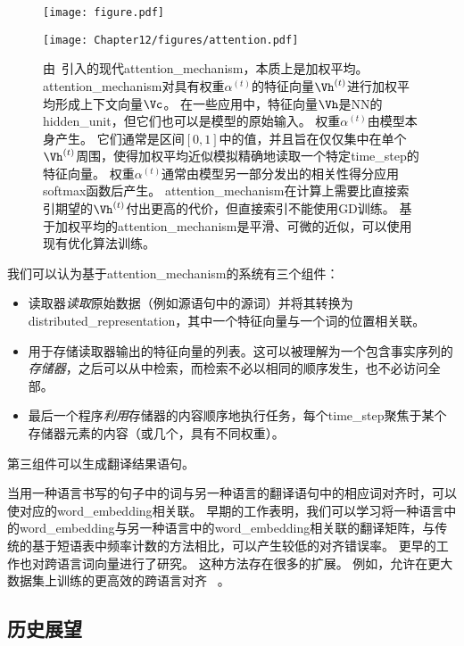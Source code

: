  \begin{figure}[htp]
\ifOpenSource
\centerline{\texttt{[image: figure.pdf]}}
\else
\centerline{\texttt{[image: Chapter12/figures/attention.pdf]}}
\fi
\caption{由~\citet{Bahdanau-et-al-ICLR2015-small}引入的现代\gls{attention_mechanism}，本质上是加权平均。
\gls{attention_mechanism}对具有权重$\alpha^{(t)}$的特征向量$\Vh^{(t)}$进行加权平均形成上下文向量$\Vc$。
在一些应用中，特征向量$\Vh$是\gls{NN}的\gls{hidden_unit}，但它们也可以是模型的原始输入。
权重$\alpha^{(t)}$由模型本身产生。
它们通常是区间$[0,1]$中的值，并且旨在仅仅集中在单个$\Vh^{(t)}$周围，使得加权平均近似模拟精确地读取一个特定\gls{time_step}的特征向量。
权重$\alpha^{(t)}$通常由模型另一部分发出的相关性得分应用softmax函数后产生。
\gls{attention_mechanism}在计算上需要比直接索引期望的$\Vh^{(t)}$付出更高的代价，但直接索引不能使用\gls{GD}训练。
基于加权平均的\gls{attention_mechanism}是平滑、可微的近似，可以使用现有优化算法训练。
}
\label{fig:chap12_attention}
\end{figure}

我们可以认为基于\gls{attention_mechanism}的系统有三个组件：
\begin{itemize}
 \item   读取器\emph{读取}原始数据（例如源语句中的源词）并将其转换为\gls{distributed_representation}，其中一个特征向量与一个词的位置相关联。
 \item 用于存储读取器输出的特征向量的列表。这可以被理解为一个包含事实序列的\emph{存储器}，之后可以从中检索，而检索不必以相同的顺序发生，也不必访问全部。
 \item 最后一个程序\emph{利用}存储器的内容顺序地执行任务，每个\gls{time_step}聚焦于某个存储器元素的内容（或几个，具有不同权重）。
\end{itemize}
第三组件可以生成翻译结果语句。


当用一种语言书写的句子中的词与另一种语言的翻译语句中的相应词对齐时，可以使对应的\gls{word_embedding}相关联。
早期的工作表明，我们可以学习将一种语言中的\gls{word_embedding}与另一种语言中的\gls{word_embedding}相关联的翻译矩阵\citep{Kocisky-et-al-ACL2014}，与传统的基于短语表中频率计数的方法相比，可以产生较低的对齐错误率。
更早的工作\citep{Klementiev-et-al-COLING2012}也对跨语言词向量进行了研究。 
这种方法存在很多的扩展。
例如，允许在更大数据集上训练的更高效的跨语言对齐~\citep{Gouws-et-al-arxiv2014} 。

\subsection{历史展望}
\label{sec:historical_perspective_chap12}

